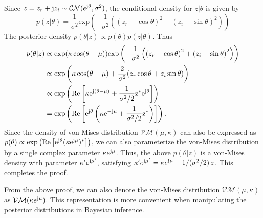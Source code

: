 \documentclass[12pt,draftclsnofoot,journal,onecolumn]{IEEEtran}
\theoremstyle{nonumberplain}
\def \exp {\text{exp}}
\def \CN {\mathcal{CN}}
\def \VM {\mathcal{VM}}
\def \re {\rm Re}
\begin{document}
    \begin{IEEEproof}
        Since $z=z_r + {\rm j} z_i \sim \CN(e^{{\rm j} \theta}, \sigma^2)$, the conditional density for $z|\theta$ is given by 
        \begin{equation}
            p(z|\theta) = \frac{1}{\sigma^2}\exp\left(-\frac{1}{\sigma^2}\left(\left(z_r - \cos\theta\right)^2 + \left(z_i - \sin\theta\right)^2\right)\right)
        \end{equation}
        The posterior density $p(\theta | z) \propto p(\theta)p(z|\theta)$. Thus
        \begin{equation}
            \begin{aligned}
                p(\theta|z) & \propto \exp(\kappa \cos(\theta - \mu))\exp\left(-\frac{1}{\sigma^2}\left(\left(z_r - \cos\theta\right)^2 + \left(z_i - \sin\theta\right)^2\right)\right) \\
                & \propto \exp\left( \kappa \cos(\theta - \mu) + \frac{2}{\sigma^2}(z_r \cos\theta + z_i\sin\theta) \right) \\
                & \propto \exp\left( \re\left[ \kappa e^{{\rm j} (\theta - \mu)} + \frac{1}{\sigma^2/2}z^{*} e^{{\rm j} \theta} \right] \right) \\
                & = \exp\left( \re\left[ e^{{\rm j} \theta}\left(\kappa e^{-{\rm j}\mu} + \frac{1}{\sigma^2/2} z^*\right)\right] \right).
            \end{aligned}
        \end{equation}
        Since the density of von-Mises distribution $\VM(\mu, \kappa)$ can also be expressed as $p(\theta) \propto \exp\left( \re\left[ e^{{\rm j} \theta}(\kappa e^{{\rm j} \mu})^* \right] \right)$, we can also parameterize the von-Mises distribution by a single complex parameter $\kappa e^{{\rm j}\mu}$. Thus, the above $p(\theta|z)$ is a von-Mises density with parameter $\kappa'e^{{\rm j}\mu'}$, satisfying $\kappa' e^{{\rm j}\mu'} = \kappa e^{{\rm j}\mu} + 1/(\sigma^2/2)\,z$. This completes the proof.
    \end{IEEEproof}
    From the above proof, we can also denote the von-Mises distribution $\VM(\mu, \kappa)$ as $\VM(\kappa e^{{\rm j}\mu})$. This representation is more convenient when manipulating the posterior distributions in Bayesian inference.
\end{document}
